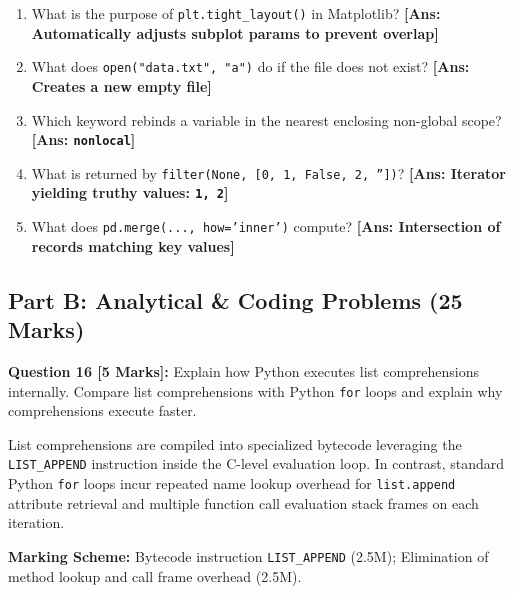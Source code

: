 \begin{enumerate}[label=\textbf{\arabic*.}]
    \item What is the purpose of \texttt{plt.tight\_layout()} in Matplotlib? \hfill \textbf{[Ans: Automatically adjusts subplot params to prevent overlap]}
    \item What does \texttt{open("data.txt", "a")} do if the file does not exist? \hfill \textbf{[Ans: Creates a new empty file]}
    \item Which keyword rebinds a variable in the nearest enclosing non-global scope? \hfill \textbf{[Ans: \texttt{nonlocal}]}
    \item What is returned by \texttt{filter(None, [0, 1, False, 2, ''])}? \hfill \textbf{[Ans: Iterator yielding truthy values: \texttt{1, 2}]}
    \item What does \texttt{pd.merge(..., how='inner')} compute? \hfill \textbf{[Ans: Intersection of records matching key values]}
\end{enumerate}

\subsection*{Part B: Analytical \& Coding Problems (25 Marks)}

\noindent\textbf{Question 16 [5 Marks]:} Explain how Python executes list comprehensions internally. Compare list comprehensions with Python \texttt{for} loops and explain why comprehensions execute faster.
\begin{solutionbox}
List comprehensions are compiled into specialized bytecode leveraging the \texttt{LIST\_APPEND} instruction inside the C-level evaluation loop. In contrast, standard Python \texttt{for} loops incur repeated name lookup overhead for \texttt{list.append} attribute retrieval and multiple function call evaluation stack frames on each iteration.
\end{solutionbox}
\begin{markingrubric}
\textbf{Marking Scheme:} Bytecode instruction \texttt{LIST\_APPEND} (2.5M); Elimination of method lookup and call frame overhead (2.5M).
\end{markingrubric}

